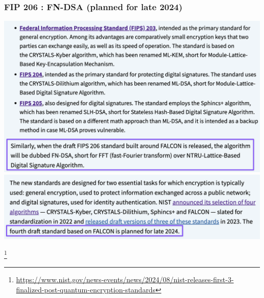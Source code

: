 \documentclass{beamer}
\begin{document}
\begin{frame}
\frametitle{FIP 206 : FN-DSA (planned for late 2024)}
\includegraphics[scale=0.3]{fips.png} 
\includegraphics[scale=0.3]{fips2.png}

\footnote{\url{https://www.nist.gov/news-events/news/2024/08/nist-releases-first-3-finalized-post-quantum-encryption-standards}}
\end{frame}
\end{document}

